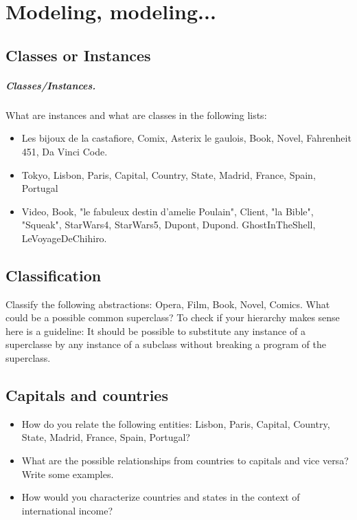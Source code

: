 \ifx\wholebook\relax\else


\fi

\chapter{Modeling, modeling...}


\section{Classes or Instances}

\paragraph{Classes/Instances.} What are instances and what are classes in the following lists:

\begin{itemize}
\item Les bijoux de la castafiore, Comix, Asterix le gaulois, Book, Novel, Fahrenheit 451, Da Vinci Code.

\item Tokyo, Lisbon, Paris, Capital, Country, State, Madrid, France, Spain, Portugal

\item Video, Book, "le fabuleux destin d'amelie Poulain", Client, "la Bible", "Squeak", StarWars4, StarWars5, Dupont,
Dupond. GhostInTheShell, LeVoyageDeChihiro.

\end{itemize}

\section{Classification}

Classify the following abstractions: Opera, Film, Book, Novel, Comics.
What could be a possible common superclass?
To check if your hierarchy makes sense here is a guideline: It should be possible to substitute any instance of a superclasse by any instance of a subclass without breaking a program of the superclass.

\section{Capitals and countries}

\begin{itemize}
\item How do you relate the following entities: Lisbon, Paris, Capital, Country, State, Madrid, France, Spain, Portugal?
\item What are the possible relationships from countries to capitals and vice versa?
Write some examples.
\item How would you characterize countries and states in the context of international income?
\end{itemize}

